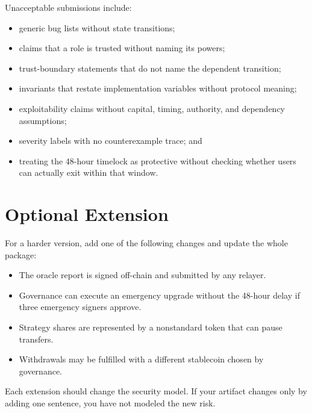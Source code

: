 Unacceptable submissions include:

\begin{itemize}
\item generic bug lists without state transitions;
\item claims that a role is trusted without naming its powers;
\item trust-boundary statements that do not name the dependent transition;
\item invariants that restate implementation variables without protocol meaning;
\item exploitability claims without capital, timing, authority, and dependency assumptions;
\item severity labels with no counterexample trace; and
\item treating the 48-hour timelock as protective without checking whether users can actually exit within that window.
\end{itemize}

\section*{Optional Extension}

For a harder version, add one of the following changes and update the whole package:

\begin{itemize}
\item The oracle report is signed off-chain and submitted by any relayer.
\item Governance can execute an emergency upgrade without the 48-hour delay if three emergency signers approve.
\item Strategy shares are represented by a nonstandard token that can pause transfers.
\item Withdrawals may be fulfilled with a different stablecoin chosen by governance.
\end{itemize}

Each extension should change the security model. If your artifact changes only by adding one sentence, you have not modeled the new risk.
